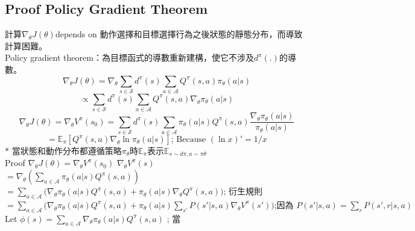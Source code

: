 \documentclass[14pt,a4paper]{report}  %
\begin{document}
\subsection{Proof Policy Gradient Theorem}
計算$\nabla_\theta J(\theta)$depends on 動作選擇和目標選擇行為之後狀態的靜態分布，而導致計算困難。\\[5pt]
Policy gradient theorem：為目標函式的導數重新建構，使它不涉及$d^\pi(.)$的導數。\\[5pt]
$$\nabla_\theta J(\theta) 
= \nabla_\theta \sum_{s \in \mathcal{S}} d^\pi(s) \sum_{a \in \mathcal{A}} Q^\pi(s, a) \pi_\theta(a \vert s) $$
$$\propto \sum_{s \in \mathcal{S}} d^\pi(s) \sum_{a \in \mathcal{A}} Q^\pi(s, a) \nabla_\theta \pi_\theta(a \vert s)$$
$$\nabla_\theta J(\theta)
= \nabla_\theta V^\pi(s_0)= \sum_{s \in \mathcal{S}} d^\pi(s) \sum_{a \in \mathcal{A}} \pi_\theta(a \vert s) Q^\pi(s, a) \frac{\nabla_\theta \pi_\theta(a \vert s)}{\pi_\theta(a \vert s)}$$
$$=\mathbb{E}_\pi [Q^\pi(s, a) \nabla_\theta \ln \pi_\theta(a \vert s)]  {\text{; Because } (\ln x)' = 1/x}$$
$\ast$ 當狀態和動作分布都遵循策略$\pi_{\theta}$時$\mathbb{E}_{\pi}$表示$\mathbb{E}_{s\sim d\pi,a\sim\pi\theta}$\\[5pt]
Proof $\nabla_\theta J(\theta)= \nabla_\theta V^\pi(s_0)$ 
$ \nabla_\theta V^\pi(s) $\\[5pt]
$= \nabla_\theta (\sum_{a \in \mathcal{A}} \pi_\theta(a \vert s)Q^\pi(s, a))$\\
$= \sum_{a \in \mathcal{A}} \Big( \nabla_\theta \pi_\theta(a \vert s)Q^\pi(s, a) + \pi_\theta(a \vert s) {\nabla_\theta Q^\pi(s, a)} \Big)  \scriptstyle{\text{; 衍生規則}} $\\
$= \sum_{a \in \mathcal{A}} \Big( \nabla_\theta \pi_\theta(a \vert s)Q^\pi(s, a) + \pi_\theta(a \vert s){\sum_{s'} P(s' \vert s,a) \nabla_\theta V^\pi(s')} \Big)  \scriptstyle{\text{;因為 }  P(s' \vert s, a) = \sum_r P(s', r \vert s, a)}$
Let $\phi(s) = \sum_{a \in \mathcal{A}} \nabla_\theta \pi_\theta(a \vert s)Q^\pi(s, a)$ ; 當
\end{document}
